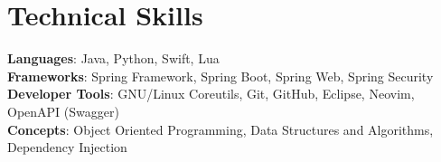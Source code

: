\documentclass[a4paper,12pt]{article}
\begin{document}
%
\section{Technical Skills}
 \begin{itemize}[leftmargin=0.15in, label={}]
    \small{\item{
     \textbf{Languages}{: Java, Python, Swift, Lua} \\
     \textbf{Frameworks}{: Spring Framework, Spring Boot, Spring Web, Spring Security} \\
     \textbf{Developer Tools}{: GNU/Linux Coreutils, Git, GitHub, Eclipse, Neovim, OpenAPI (Swagger)} \\
     \textbf{Concepts}{: Object Oriented Programming, Data Structures and Algorithms, Dependency Injection}
    }}
 \end{itemize}


\end{document}
